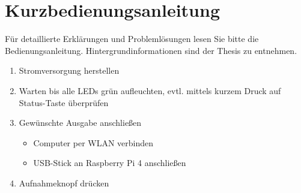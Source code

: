 \documentclass[./00PhotoBox.tex]{subfiles}
\begin{document}
\chapter{Kurzbedienungsanleitung}

Für detaillierte Erklärungen und Problemlösungen lesen Sie bitte die Bedienungsanleitung. Hintergrundinformationen sind der Thesis zu entnehmen.


\begin{enumerate}
    \item Stromversorgung herstellen
    \item Warten bis alle LEDs grün aufleuchten, evtl. mittels kurzem Druck auf Status-Taste überprüfen
    \item Gewünschte Ausgabe anschließen
          \begin{itemize}
              \item Computer per WLAN verbinden
              \item USB-Stick an Raspberry Pi 4 anschließen
          \end{itemize}
    \item Aufnahmeknopf drücken
\end{enumerate}

\biblio
\end{document}
